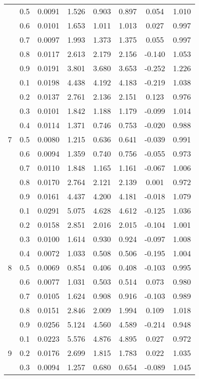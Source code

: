 \documentclass[11pt,a4paper]{report}
\begin{document}
\begin{longtable}{ | c | c || c | c | c | c | c | c | }
 & 0.5 & 0.0091 & 1.526 & 0.903 & 0.897 & 0.054 & 1.010 \\
 & 0.6 & 0.0101 & 1.653 & 1.011 & 1.013 & 0.027 & 0.997 \\
 & 0.7 & 0.0097 & 1.993 & 1.373 & 1.375 & 0.055 & 0.997 \\
 & 0.8 & 0.0117 & 2.613 & 2.179 & 2.156 & -0.140 & 1.053 \\
 & 0.9 & 0.0191 & 3.801 & 3.680 & 3.653 & -0.252 & 1.226 \\
 \hline
\multirow{9}{*}{7} & 0.1 & 0.0198 & 4.438 & 4.192 & 4.183 & -0.219 & 1.038 \\
 & 0.2 & 0.0137 & 2.761 & 2.136 & 2.151 & 0.123 & 0.976 \\
 & 0.3 & 0.0101 & 1.842 & 1.188 & 1.179 & -0.099 & 1.014 \\
 & 0.4 & 0.0114 & 1.371 & 0.746 & 0.753 & -0.020 & 0.988 \\
 & 0.5 & 0.0080 & 1.215 & 0.636 & 0.641 & -0.039 & 0.991 \\
 & 0.6 & 0.0094 & 1.359 & 0.740 & 0.756 & -0.055 & 0.973 \\
 & 0.7 & 0.0110 & 1.848 & 1.165 & 1.161 & -0.067 & 1.006 \\
 & 0.8 & 0.0170 & 2.764 & 2.121 & 2.139 & 0.001 & 0.972 \\
 & 0.9 & 0.0161 & 4.437 & 4.200 & 4.181 & -0.018 & 1.079 \\
 \hline
\multirow{9}{*}{8} & 0.1 & 0.0291 & 5.075 & 4.628 & 4.612 & -0.125 & 1.036 \\
 & 0.2 & 0.0158 & 2.851 & 2.016 & 2.015 & -0.104 & 1.001 \\
 & 0.3 & 0.0100 & 1.614 & 0.930 & 0.924 & -0.097 & 1.008 \\
 & 0.4 & 0.0072 & 1.033 & 0.508 & 0.506 & -0.195 & 1.004 \\
 & 0.5 & 0.0069 & 0.854 & 0.406 & 0.408 & -0.103 & 0.995 \\
 & 0.6 & 0.0077 & 1.031 & 0.503 & 0.514 & 0.073 & 0.980 \\
 & 0.7 & 0.0105 & 1.624 & 0.908 & 0.916 & -0.103 & 0.989 \\
 & 0.8 & 0.0151 & 2.846 & 2.009 & 1.994 & 0.109 & 1.018 \\
 & 0.9 & 0.0256 & 5.124 & 4.560 & 4.589 & -0.214 & 0.948 \\
 \hline
\multirow{9}{*}{9} & 0.1 & 0.0223 & 5.576 & 4.876 & 4.895 & 0.027 & 0.972 \\
 & 0.2 & 0.0176 & 2.699 & 1.815 & 1.783 & 0.022 & 1.035 \\
 & 0.3 & 0.0094 & 1.257 & 0.680 & 0.654 & -0.089 & 1.045 \\

\end{longtable}
\end{document}

